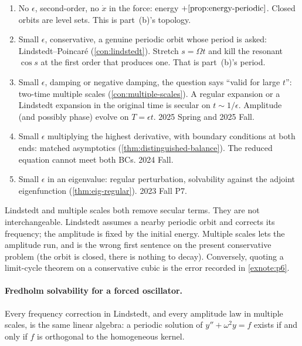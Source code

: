 \documentclass[11pt,a4paper]{article}
\begin{document}
\begin{enumerate}[label=\textup{(\roman*)}]
    \item No \(\epsilon\), second-order, no \(\dot x\) in the force: energy \(+\cref{prop:energy-periodic}\). Closed orbits are level sets. This is part~(b)'s topology.
    \item Small \(\epsilon\), conservative, a genuine periodic orbit whose period is asked: Lindstedt--Poincar\'e (\cref{con:lindstedt}). Stretch \(s=\Omega t\) and kill the resonant \(\cos s\) at the first order that produces one. That is part~(b)'s period.
    \item Small \(\epsilon\), damping or negative damping, the question says ``valid for large \(t\)'': two-time multiple scales (\cref{con:multiple-scales}). A regular expansion or a Lindstedt expansion in the original time is secular on \(t\sim 1/\epsilon\). Amplitude (and possibly phase) evolve on \(T=\epsilon t\). 2025 Spring and 2025 Fall.
    \item Small \(\epsilon\) multiplying the highest derivative, with boundary conditions at both ends: matched asymptotics (\cref{thm:distinguished-balance}). The reduced equation cannot meet both BCs. 2024 Fall.
    \item Small \(\epsilon\) in an eigenvalue: regular perturbation, solvability against the adjoint eigenfunction (\cref{thm:eig-regular}). 2023 Fall P7.
\end{enumerate}

\begin{warning}
\label{warn:lindstedt-vs-ms}
Lindstedt and multiple scales both remove secular terms. They are not interchangeable. Lindstedt assumes a nearby periodic orbit and corrects its frequency; the amplitude is fixed by the initial energy. Multiple scales lets the amplitude run, and is the wrong first sentence on the present conservative problem (the orbit is closed, there is nothing to decay). Conversely, quoting a limit-cycle theorem on a conservative cubic is the error recorded in \cref{exnote:p6}.
\end{warning}

\paragraph{Fredholm solvability for a forced oscillator.}

Every frequency correction in Lindstedt, and every amplitude law in multiple scales, is the same linear algebra: a periodic solution of \(y''+\omega^{2}y=f\) exists if and only if \(f\) is orthogonal to the homogeneous kernel.
\end{document}
